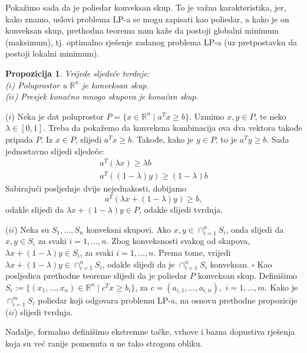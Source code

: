 \documentclass[a4paper, utf8, 11pt, colorlinks]{book}
\newtheorem{prop}{Propozicija}
\newenvironment{proof}{{Dokaz:}}{\hfill$\square$}
\begin{document}
Pokažimo sada da je poliedar konveksan skup. To je važna karakteristika, jer, kako znamo, uslovi problema LP-a se mogu zapisati kao poliedar, a kako je on konveksan skup, prethodna teorema nam kaže da postoji globalni minimum (maksimum), tj. optimalno rješenje zadanog problema LP-a (uz pretpostavku da postoji lokalni minimum).
\begin{prop}Vrijede sljedeće tvrdnje: \\
  ($i$)  Poluprostor u $\mathbb{R}^n$ je konveksan skup.  \\
  ($ii$) Presjek konačno mnogo skupova je konačan skup. 
\end{prop}

\begin{proof}
  ($i$) Neka je dat poluprostor $P = \{ x \in \mathbb{R}^n \mid a^T x \geq b \}$. Uzmimo $x, y \in P$, te neko $\lambda \in [0, 1]$. Treba da pokažemo da konveksna kombinacija ova dva vektora takođe pripada $P$. Iz $x \in P$, slijedi  $a^T x \geq b$. Takođe, kako je $y \in P$, to je  $a^T y \geq b$. 
  Sada jednostavno slijedi sljedeće:
  \begin{align}
      a^T (\lambda x) \geq \lambda b \\
      a^T ((1-\lambda) y) \geq (1-\lambda) b 
  \end{align}
  Sabirajući posljednje dvije nejednakosti, dobijamo 
  \begin{equation}
      a^T( \lambda x + (1 - \lambda) y ) \geq b,
  \end{equation}
  odakle slijedi da $\lambda x + (1-\lambda) y \in P$, odakle slijedi tvrdnja. 
  
  ($ii$) Neka su $S_1,\ldots, S_n$ konveksni skupovi. Ako $x,y \in \cap_{i=1}^n S_i$, onda slijedi da $x,y \in S_i$ za svaki $i=1,\ldots,n$. Zbog konveksnosti svakog od skupova,  
  $\lambda x + (1 - \lambda) y \in S_i$, za svaki $i=1,\ldots,n$. Prema tome, vrijedi $ \lambda x + (1-\lambda) y \in \cap_{i=1}^n S_i$, odakle slijedi da je $\cap_{i=1}^n S_i$ konveksan. 
\end{proof}
Kao posljedica prethodne teoreme slijedi da je poliedar $P$ konveksan skup. 
  Definišimo $S_i:= \{ (x_1,\ldots, x_n) \in \mathbb{R}^n \mid c^T x \geq b_i \}$, za  $c = (a_{i,1}, \ldots, a_{i, n}),$  $ i=1,\ldots, m$. Kako je $\cap_{i=1}^m S_i$ poliedar koji odgovara problemu LP-a, na osnovu prethodne propozicije ($ii$) slijedi tvrdnja. 

Nadalje, formalno definišimo ekstremne tačke, vrhove i bazna dopustiva rješenja koja su već ranije pomenuta u ne tako strogom obliku. 
\end{document}
